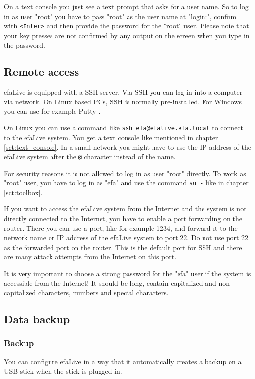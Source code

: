 \documentclass[a4paper,12pt,twoside]{article}
\begin{document}
On a text console you just see a text prompt that asks for a user name.
So to log in as user "root" you have to
pass "root" as the user name at
"login:", confirm with
\texttt{{\textless}Enter{\textgreater}} and then provide the password for the
"root" user. Please note that your key
presses are not confirmed by any output on the screen when you type in
the password.


\subsection{Remote access}
\label{sct:remote_access}
efaLive is equipped with a SSH server. Via SSH you can log in into a
computer via network. On Linux based PCs, SSH is normally
pre-installed. For Windows you can use for example Putty \cite{PUT1}.

On Linux you can use a command like \texttt{ssh
efa@efalive.efa.local} to connect to the efaLive system.
You get a text console like mentioned in chapter \ref{sct:text_console}. In a small
network you might have to use the IP address of the efaLive system
after the \texttt{@} character instead of the
name.

For security reasons it is not allowed to log in as user
"root" directly. To work as
"root" user, you have to log in as
"efa" and use the command \texttt{su -} like in chapter \ref{sct:toolbox}.

If you want to access the efaLive system from the Internet and the
system is not directly connected to the Internet, you have to enable a
port forwarding on the router. There you can use a port, like for
example 1234, and forward it to the network name or IP address of the
efaLive system to port 22. Do not use port 22 as the forwarded port on
the router. This is the default port for SSH and there are many attack
attempts from the Internet on this port.

It is very important to choose a strong password for the
"efa" user if the system is accessible from
the Internet! It should be long, contain capitalized and
non-capitalized characters, numbers and special characters.


\subsection{Data backup}
\label{sct:data_backup}
\subsubsection{Backup}
\label{sct:backup}
You can configure efaLive in a way
that it automatically creates a backup on a USB stick when the stick is
plugged in.
\end{document}
